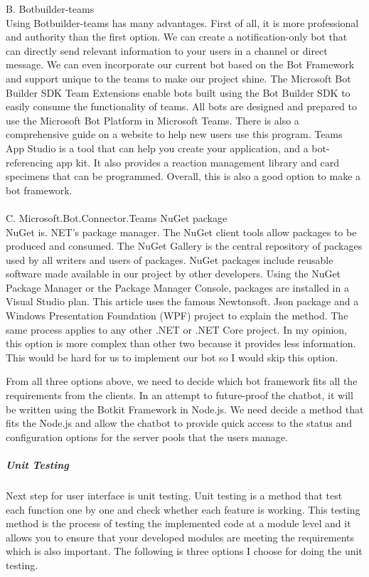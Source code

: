 B. Botbuilder-teams\\
Using Botbuilder-teams has many advantages. First of all, it is more professional and authority than the first option. We can create a notification-only bot that can directly send relevant information to your users in a channel or direct message\cite{createbot}. We can even incorporate our current bot based on the Bot Framework and support unique to the teams to make our project shine. The Microsoft Bot Builder SDK Team Extensions enable bots built using the Bot Builder SDK to easily consume the functionality of teams\cite{bbteam}. All bots are designed and prepared to use the Microsoft Bot Platform in Microsoft Teams\cite{createbot}. There is also a comprehensive guide on a website to help new users use this program. Teams App Studio is a tool that can help you create your application, and a bot-referencing app kit. It also provides a reaction management library and card specimens that can be programmed\cite{createbot}. Overall, this is also a good option to make a bot framework.\\
\\
C. Microsoft.Bot.Connector.Teams NuGet package\\
NuGet is. NET's package manager. The NuGet client tools allow packages to be produced and consumed. The NuGet Gallery is the central repository of packages used by all writers and users of packages\cite{nuget}. NuGet packages include reusable software made available in our project by other developers. Using the NuGet Package Manager or the Package Manager Console, packages are installed in a Visual Studio plan. This article uses the famous Newtonsoft. Json package and a Windows Presentation Foundation (WPF) project to explain the method. The same process applies to any other .NET or .NET Core project\cite{nuget}.
In my opinion, this option is more complex than other two because it provides less information. This would be hard for us to implement our bot so I would skip this option.


From all three options above, we need to decide which bot framework fits all the requirements from the clients. In an attempt to future-proof the chatbot, it will be written using the Botkit Framework in Node.js. We need decide a method that fits the Node.js and allow the chatbot to provide quick access to the status and configuration options for the server pools that the users manage.

\subparagraph{Unit Testing}
Next step for user interface is unit testing. Unit testing is a method that test each function one by one and check whether each feature is working. This testing method is the process of testing the implemented code at a module level and it allows you to ensure that your developed modules are meeting the requirements which is also important. The following is three options I choose for doing the unit testing. 

